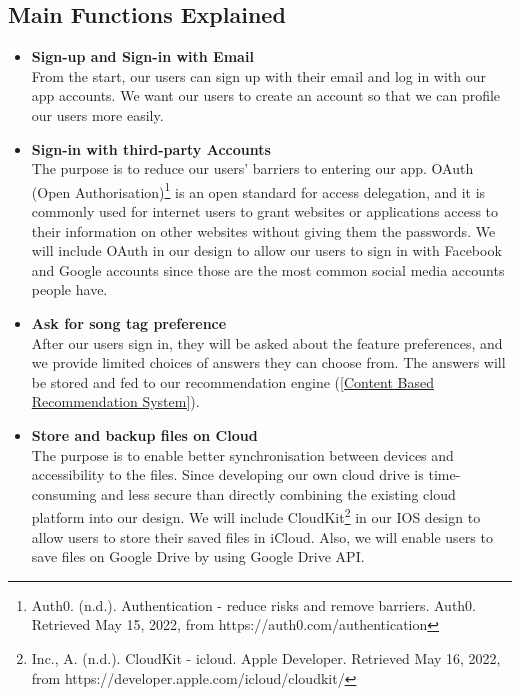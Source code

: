  \subsection{Main Functions Explained}

\begin{itemize}

\item \textbf{Sign-up and Sign-in with Email}
\\From the start, our users can sign up with their email and log in with our app accounts. We want our users to create an account so that we can profile our users more easily.

\item \textbf{Sign-in with third-party Accounts}
\\ The purpose is to reduce our users' barriers to entering our app. OAuth (Open Authorisation)\footnote{Auth0. (n.d.). Authentication - reduce risks and remove barriers. Auth0. Retrieved May 15, 2022, from https://auth0.com/authentication } is an open standard for access delegation, and it is commonly used for internet users to grant websites or applications access to their information on other websites without giving them the passwords. We will include OAuth in our design to allow our users to sign in with Facebook and Google accounts since those are the most common social media accounts people have.

\item \textbf{Ask for song tag preference}
\\After our users sign in, they will be asked about the feature preferences, and we provide limited choices of answers they can choose from. The answers will be stored and fed to our recommendation engine (\cref{Content Based Recommendation System}). 

\item \textbf{Store and backup files on Cloud}
\\The purpose is to enable better synchronisation between devices and accessibility to the files. Since developing our own cloud drive is time-consuming and less secure than directly combining the existing cloud platform into our design. 
We will include CloudKit\footnote{Inc., A. (n.d.). CloudKit - icloud. Apple Developer. Retrieved May 16, 2022, from https://developer.apple.com/icloud/cloudkit/} in our IOS design to allow users to store their saved files in iCloud. Also, we will enable users to save files on Google Drive by using Google Drive API.


\end{itemize}
